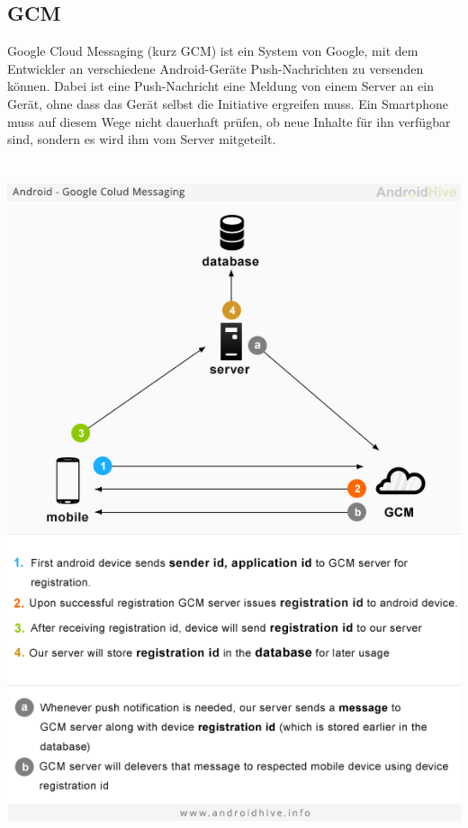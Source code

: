 \documentclass[10pt, a4paper,headsepline,pointednumbers]{scrreprt}
\begin{document}
\subsection{GCM}
Google Cloud Messaging (kurz GCM) ist ein System von Google, mit dem Entwickler an verschiedene Android-Geräte Push-Nachrichten zu versenden können. Dabei ist eine Push-Nachricht eine Meldung von einem Server an ein Gerät, ohne dass das Gerät selbst die Initiative ergreifen muss. Ein Smartphone muss auf diesem Wege nicht dauerhaft prüfen, ob neue Inhalte für ihn verfügbar sind, sondern es wird ihm vom Server mitgeteilt. \\ \\ \\
\includegraphics[scale=0.6]{gcm-a-modr.png}
\end{document}
